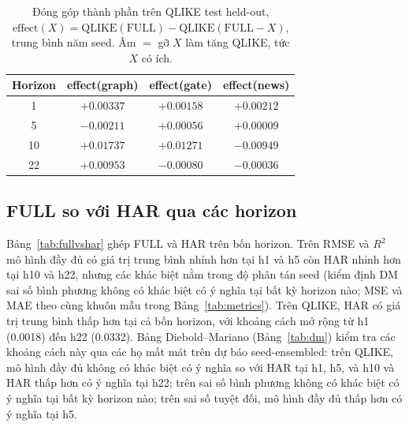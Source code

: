 \documentclass[runningheads]{llncs}
\begin{document}
\begin{table}[t]
\caption{Đóng góp thành phần trên QLIKE test held-out,
$\text{effect}(X)=\text{QLIKE}(\text{FULL})-\text{QLIKE}(\text{FULL}{-}X)$, trung bình năm seed. Âm $=$ gỡ
$X$ làm tăng QLIKE, tức $X$ có ích.}
\label{tab:effect}
\centering
\begin{tabular}{cccc}
\toprule
Horizon & effect(graph) & effect(gate) & effect(news) \\
\midrule
1  & $+0.00337$ & $+0.00158$ & $+0.00212$ \\
5  & $-0.00211$ & $+0.00056$ & $+0.00009$ \\
10 & $+0.01737$ & $+0.01271$ & $-0.00949$ \\
22 & $+0.00953$ & $-0.00080$ & $-0.00036$ \\
\bottomrule
\end{tabular}
\end{table}

\subsection{FULL so với HAR qua các horizon}
\label{sec:fullvshar}
Bảng~\ref{tab:fullvshar} ghép FULL và HAR trên bốn horizon. Trên RMSE và $R^2$ mô hình đầy đủ có giá trị
trung bình nhỉnh hơn tại h1 và h5 còn HAR nhỉnh hơn tại h10 và h22, nhưng các khác biệt nằm trong độ phân
tán seed (kiểm định DM sai số bình phương không có khác biệt có ý nghĩa tại bất kỳ horizon nào; MSE và
MAE theo cùng khuôn mẫu trong Bảng~\ref{tab:metrics}). Trên QLIKE, HAR có giá trị trung bình thấp hơn tại
cả bốn horizon, với khoảng cách mở rộng từ h1 (0.0018) đến h22 (0.0332). Bảng Diebold--Mariano
(Bảng~\ref{tab:dm}) kiểm tra các khoảng cách này qua các họ mất mát trên dự báo seed-ensembled: trên
QLIKE, mô hình đầy đủ không có khác biệt có ý nghĩa so với HAR tại h1, h5, và h10 và HAR thấp hơn có ý
nghĩa tại h22; trên sai số bình phương không có khác biệt có ý nghĩa tại bất kỳ horizon nào; trên sai số
tuyệt đối, mô hình đầy đủ thấp hơn có ý nghĩa tại h5.
\end{document}
